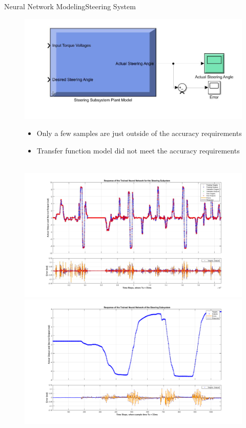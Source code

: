 \documentclass{beamer}
\begin{document}
\begin{frame}{Neural Network Modeling}{Steering System}
	\begin{block}{}
  		\begin{figure}[H]
  			\centering \includegraphics[width=.45\linewidth , height=.37\textheight]{figs/img/steeringSimulinkBlock.jpg}\quad%
			\centering \begin{minipage}[b][0.4\textheight][c]{.45\linewidth}  \begin{itemize}
			\item Only a few samples are just outside of the accuracy requirements
			\item Transfer function model did not meet the accuracy requirements
			\end{itemize} \end{minipage}\\[1em]
			\centering \includegraphics[width=.45\linewidth , height=.37\textheight]{figs/img/steeringNeuralNetworkTrainedOutput.jpg}\quad%
			\centering \includegraphics[width=.45\linewidth , height=.37\textheight]{figs/img/steeringNeuralNetworkTrainedOutput2.jpg}
  		\end{figure}
	\end{block}
\end{frame}
\end{document}
